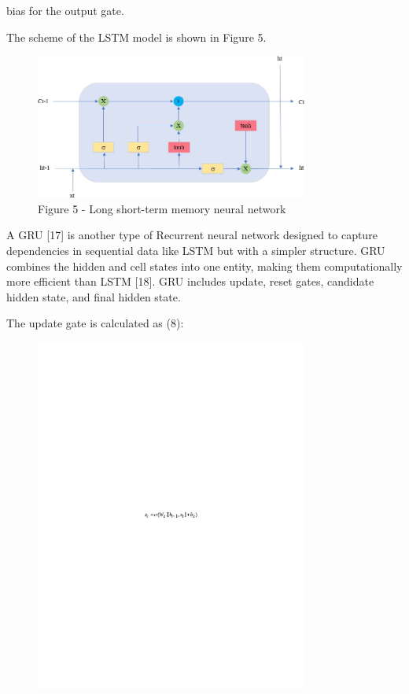 bias for the output gate.

The scheme of the LSTM model is shown in Figure 5.

\begin{figure}[H]
	\centering
	\includegraphics[width=0.8\textwidth]{media/ict/image63}
	\caption*{Figure 5 - Long short-term memory neural network}
\end{figure}

A GRU {[}17{]} is another type of Recurrent neural network designed to
capture dependencies in sequential data like LSTM but with a simpler
structure. GRU combines the hidden and cell states into one entity,
making them computationally more efficient than LSTM {[}18{]}. GRU
includes update, reset gates, candidate hidden state, and final hidden
state.

The update gate is calculated as (8):

\begin{figure}[H]
	\centering
	\includegraphics[width=0.8\textwidth]{media/ict/image64}
	\caption*{}
\end{figure}

